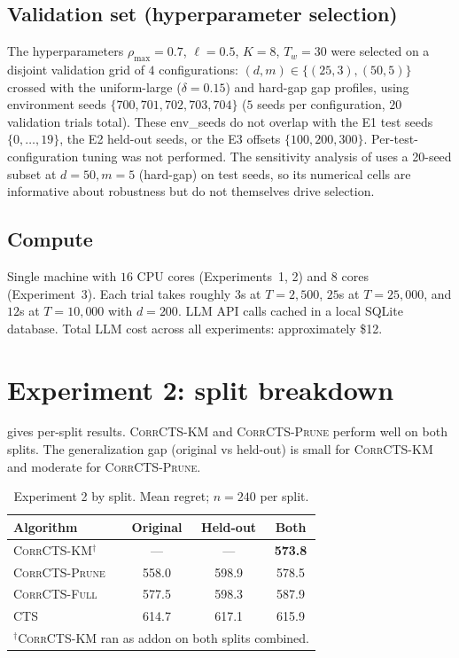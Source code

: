 \documentclass{article}
\theoremstyle{plain}
\theoremstyle{definition}
\theoremstyle{remark}
\newcommand{\CorrFull}{\textsc{CorrCTS-Full}}
\newcommand{\EdgePrune}{\textsc{CorrCTS-Prune}}
\newcommand{\KMRefine}{\textsc{CorrCTS-KM}}
\begin{document}
\subsection{Validation set (hyperparameter selection)}\label{app:valset}

The hyperparameters $\rho_{\max} = 0.7$, $\ell = 0.5$, $K = 8$, $T_w = 30$ were selected on a disjoint validation grid of $4$ configurations: $(d, m) \in \{(25, 3), (50, 5)\}$ crossed with the uniform-large ($\delta = 0.15$) and hard-gap gap profiles, using environment seeds $\{700, 701, 702, 703, 704\}$ ($5$ seeds per configuration, $20$ validation trials total).
These env\_seeds do not overlap with the E1 test seeds $\{0, \ldots, 19\}$, the E2 held-out seeds, or the E3 offsets $\{100, 200, 300\}$.
Per-test-configuration tuning was not performed.
The sensitivity analysis of  uses a 20-seed subset at $d{=}50, m{=}5$ (hard-gap) on test seeds, so its numerical cells are informative about robustness but do not themselves drive selection.

\subsection{Compute}

Single machine with $16$ CPU cores (Experiments~1, 2) and $8$ cores (Experiment~3).
Each trial takes roughly $3$s at $T = 2{,}500$, $25$s at $T = 25{,}000$, and $12$s at $T = 10{,}000$ with $d = 200$.
LLM API calls cached in a local SQLite database.
Total LLM cost across all experiments: approximately \$12.

\section{Experiment 2: split breakdown}\label{app:tier7details}

 gives per-split results.
\KMRefine{} and \EdgePrune{} perform well on both splits.
The generalization gap (original vs held-out) is small for \KMRefine{} and moderate for \EdgePrune{}.

\begin{table}[h]
\caption{Experiment 2 by split. Mean regret; $n = 240$ per split.}
\label{tab:tier7splits}
\centering
\small
\begin{tabular}{@{}lccc@{}}
\toprule
Algorithm & Original & Held-out & Both \\
\midrule
\KMRefine{}$^\dagger$ & --- & --- & \textbf{573.8} \\
\EdgePrune{} & 558.0 & 598.9 & 578.5 \\
\CorrFull{} & 577.5 & 598.3 & 587.9 \\
CTS & 614.7 & 617.1 & 615.9 \\
\bottomrule
\multicolumn{4}{l}{\footnotesize $^\dagger$\KMRefine{} ran as addon on both splits combined.}
\end{tabular}
\end{table}
\end{document}
